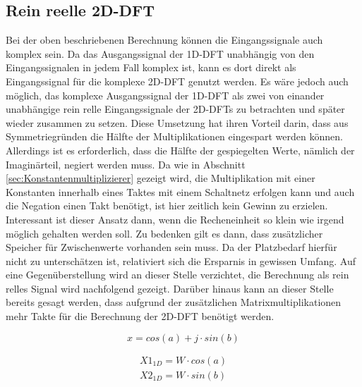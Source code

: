 \subsection{Rein reelle 2D-DFT}
Bei der oben beschriebenen Berechnung können die Eingangssignale auch komplex sein. Da das Ausgangssignal der 1D-DFT unabhängig von den Eingangssignalen in jedem Fall 
komplex ist, kann es dort direkt als Eingangssignal für die komplexe 2D-DFT genutzt werden. 
Es wäre jedoch auch möglich, das komplexe Ausgangssignal der 1D-DFT als zwei von einander unabhängige rein relle Eingangssignale der 2D-DFTs zu betrachten und später 
wieder zusammen zu setzen. 
Diese Umsetzung hat ihren Vorteil darin, dass aus Symmetriegründen die Hälfte der Multiplikationen eingespart werden können. Allerdings ist es erforderlich, dass die 
Hälfte der gespiegelten Werte, nämlich der Imaginärteil, negiert werden muss. Da wie in Abschnitt \ref{sec:Konstantenmultiplizierer} gezeigt wird, die Multiplikation
mit einer Konstanten innerhalb eines Taktes mit einem Schaltnetz erfolgen kann und auch die Negation einen Takt benötigt, ist hier zeitlich kein Gewinn zu erzielen.
Interessant ist dieser Ansatz dann, wenn die Recheneinheit so klein wie irgend möglich gehalten werden soll. Zu bedenken gilt es dann, dass zusätzlicher Speicher für 
Zwischenwerte vorhanden sein muss. Da der Platzbedarf hierfür nicht zu unterschätzen ist, relativiert sich die Ersparnis in gewissen Umfang. Auf eine Gegenüberstellung
wird an dieser Stelle verzichtet, die Berechnung als rein relles Signal wird nachfolgend gezeigt.
Darüber hinaus kann an dieser Stelle bereits gesagt werden, dass aufgrund der zusätzlichen Matrixmultiplikationen mehr Takte für die Berechnung der 2D-DFT benötigt werden.

\begin{equation}
 x = cos(a) + j \cdot sin(b) 
\end{equation}


\begin{equation}
\begin{align}
 X1_{1D} = W \cdot cos(a)\\
 X2_{1D} = W \cdot sin(b)
\end{align}
\end{equation}

% 

